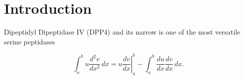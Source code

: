 \section{Introduction}
\label{intro} 

Dipeptidyl Dipeptidase IV (DPP4) and its narrow is one of the most versatile serine peptidases  

\begin{equation}
\label{eqn:drag}
	\int_a^bu\frac{d^2v}{dx^2}\,dx
	=\left.u\frac{dv}{dx}\right|_a^b
	-\int_a^b\frac{du}{dx}\frac{dv}{dx}\,dx.
\end{equation}
